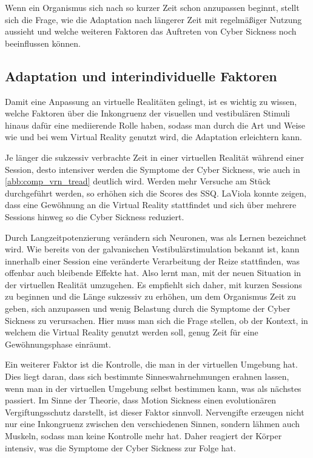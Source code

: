 Wenn ein Organismus sich nach so kurzer Zeit schon anzupassen beginnt, stellt sich die Frage, wie die Adaptation nach l\"angerer Zeit mit regelm\"a{\ss}iger Nutzung aussieht und welche weiteren Faktoren das Auftreten von Cyber Sickness noch beeinflussen k\"onnen.

\subsection{Adaptation und interindividuelle Faktoren}\label{Adaptation}

Damit eine Anpassung an virtuelle Realit\"aten gelingt, ist es wichtig zu wissen, welche Faktoren \"uber die Inkongruenz der visuellen und vestibul\"aren Stimuli hinaus daf\"ur eine mediierende Rolle haben, sodass man durch die Art und Weise wie und bei wem Virtual Reality genutzt wird, die Adaptation erleichtern kann.

Je l\"anger die sukzessiv verbrachte Zeit in einer virtuellen Realit\"at w\"ahrend einer Session, desto intensiver werden die Symptome der Cyber Sickness\cite{Aldaba:2017:VRNTreadGraphic}, wie auch in \autoref{abb:comp_vrn_tread} deutlich wird. Werden mehr Versuche am St\"uck durchgef\"uhrt werden, so erh\"ohen sich die Scores des SSQ. LaViola\cite{LaViola:2000:CSinVR} konnte zeigen, dass eine Gew\"ohnung an die Virtual Reality stattfindet und sich \"uber mehrere Sessions hinweg so die Cyber Sickness reduziert.

Durch Langzeitpotenzierung ver\"andern sich Neuronen, was als Lernen bezeichnet wird. 
Wie bereits von der galvanischen Vestibul\"arstimulation bekannt ist, kann innerhalb einer Session eine ver\"anderte Verarbeitung der Reize stattfinden, was offenbar auch bleibende Effekte hat. Also lernt man, mit der neuen Situation in der virtuellen Realit\"at umzugehen.
Es empfiehlt sich daher, mit kurzen Sessions zu beginnen und die L\"ange sukzessiv zu erh\"ohen, um dem Organismus Zeit zu geben, sich anzupassen und wenig Belastung durch die Symptome der Cyber Sickness zu verursachen.
Hier muss man sich die Frage stellen, ob der Kontext, in welchem die Virtual Reality genutzt werden soll, genug Zeit f\"ur eine Gew\"ohnungsphase einr\"aumt.

Ein weiterer Faktor ist die Kontrolle, die man in der virtuellen Umgebung hat\cite{Kolasinski:1995:control}. Dies liegt daran, dass sich bestimmte Sinneswahrnehmungen erahnen lassen, wenn man in der virtuellen Umgebung selbst bestimmen kann, was als n\"achstes passiert. Im Sinne der Theorie, dass Motion Sickness einen evolution\"aren Vergiftungsschutz darstellt, ist dieser Faktor sinnvoll. Nervengifte erzeugen nicht nur eine Inkongruenz zwischen den verschiedenen Sinnen, sondern l\"ahmen auch Muskeln, sodass man keine Kontrolle mehr hat. Daher reagiert der K\"orper intensiv, was die Symptome der Cyber Sickness zur Folge hat.

